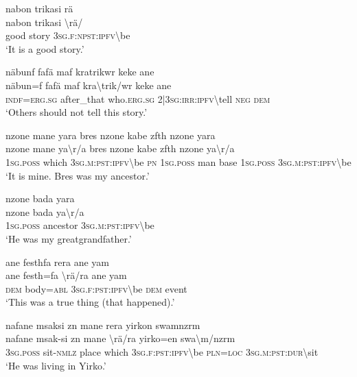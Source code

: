 \ea\label{ex:8:a1878}
nabon trikasi rä\\
\gll nabon	trikasi	{\textbackslash}rä/\\
     good	story	3\textsc{sg}.\textsc{f}:\textsc{npst}:\textsc{ipfv}{\textbackslash}be\\
\glt `It is a good story.'
\z

\ea\label{ex:8:a1879}
näbunf fafä maf kratrikwr keke ane\\
\gll näbun=f	fafä	maf	kra{\textbackslash}trik/wr	keke	ane\\
     \textsc{indf}=\textsc{erg}.\textsc{sg}	after\_that	who.\textsc{erg}.\textsc{sg}	2|3\textsc{sg}:\textsc{irr}:\textsc{ipfv}{\textbackslash}tell	\textsc{neg}	\textsc{dem}\\
\glt `Others should not tell this story.'
\z

\ea\label{ex:8:a1880}
nzone mane yara bres nzone kabe zfth nzone yara\\
\gll nzone	mane	ya{\textbackslash}r/a	bres	nzone	kabe	zfth	nzone	ya{\textbackslash}r/a\\
     1\textsc{sg}.\textsc{poss}	which	3\textsc{sg}.\textsc{m}:\textsc{pst}:\textsc{ipfv}{\textbackslash}be	\textsc{pn}	1\textsc{sg}.\textsc{poss}	man	base	1\textsc{sg}.\textsc{poss}	3\textsc{sg}.\textsc{m}:\textsc{pst}:\textsc{ipfv}{\textbackslash}be\\
\glt `It is mine. Bres was my ancestor.'
\z

\ea\label{ex:8:a1881}
nzone bada yara\\
\gll nzone	bada	ya{\textbackslash}r/a\\
     1\textsc{sg}.\textsc{poss}	ancestor	3\textsc{sg}.\textsc{m}:\textsc{pst}:\textsc{ipfv}{\textbackslash}be\\
\glt `He was my greatgrandfather.'
\z

\ea\label{ex:8:a1882}
ane festhfa rera ane yam\\
\gll ane	festh=fa	{\textbackslash}rä/ra	ane	yam\\
     \textsc{dem}	body=\textsc{abl}	3\textsc{sg}.\textsc{f}:\textsc{pst}:\textsc{ipfv}{\textbackslash}be	\textsc{dem}	event\\
\glt `This was a true thing (that happened).'
\z

\ea\label{ex:8:a1884}
nafane msaksi zn mane rera yirkon swamnzrm\\
\gll nafane	msak-si	zn	mane	{\textbackslash}rä/ra	yirko=en	swa{\textbackslash}m/nzrm\\
     3\textsc{sg}.\textsc{poss}	sit-\textsc{nmlz}	place	which	3\textsc{sg}.\textsc{f}:\textsc{pst}:\textsc{ipfv}{\textbackslash}be	\textsc{pln}=\textsc{loc}	3\textsc{sg}.\textsc{m}:\textsc{pst}:\textsc{dur}{\textbackslash}sit\\
\glt `He was living in Yirko.'
\z

